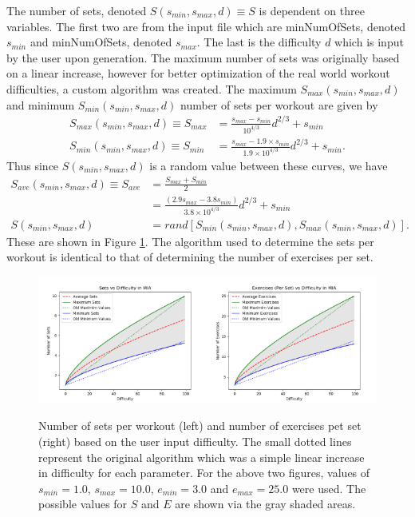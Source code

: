 The number of sets, denoted $S(s_{min},s_{max},d) \equiv S$ is dependent on three variables. The first two are from the input file which are minNumOfSets, denoted $s_{min}$ and minNumOfSets, denoted $s_{max}$. The last is the difficulty $d$ which is input by the user upon generation. The maximum number of sets was originally based on a linear increase, however for better optimization of the real world workout difficulties, a custom algorithm was created. The maximum $S_{max}(s_{min},s_{max},d)$ and minimum $S_{min}(s_{min},s_{max},d)$ number of sets per workout are given by
\begin{align}
S_{max}(s_{min},s_{max},d) \equiv S_{max}&= \frac{s_{max}-s_{min}}{10^{4/3}} d^{2/3}+s_{min} \\
S_{min}(s_{min},s_{max},d) \equiv S_{min}&= \frac{s_{max}-1.9 \times s_{min}}{1.9 \times 10^{4/3}} d^{2/3}+s_{min}.
\end{align}
Thus since $S(s_{min},s_{max},d)$ is a random value between these curves, we have
\begin{align}
S_{ave}(s_{min},s_{max},d) \equiv S_{ave} &= \frac{S_{max}+ S_{min}}{2} \\ &= \frac{\left(2.9s_{max}-3.8s_{min}\right)}{3.8 \times 10^{4/3}}d^{2/3}+s_{min} \\
S(s_{min},s_{max},d) &= rand[S_{min}(s_{min},s_{max},d),S_{max}(s_{min},s_{max},d)].
\end{align}
These are shown in Figure \ref{Svd and Evd}. The algorithm used to determine the sets per workout is identical to that of determining the number of exercises per set.

\begin{figure}[h]
	\centering
	\includegraphics[width=0.5\textwidth]{Images/Svd.png}\includegraphics[width=0.5\textwidth]{Images/Evd.png}
	\caption{Number of sets per workout (left) and number of exercises pet set (right) based on the user input difficulty. The small dotted lines represent the original algorithm which was a simple linear increase in difficulty for each parameter. For the above two figures, values of $s_{min}=1.0$, $s_{max} = 10.0$, $e_{min}=3.0$ and $e_{max}=25.0$ were used. The possible values for $S$ and $E$ are shown via the gray shaded areas.} \label{Svd and Evd}
\end{figure}


